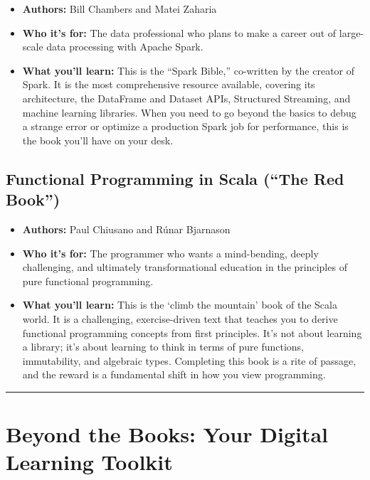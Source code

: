 \documentclass[
  letterpaper,
  DIV=11,
  numbers=noendperiod]{scrreprt}
\providecommand{\tightlist}{%
  \setlength{\itemsep}{0pt}\setlength{\parskip}{0pt}}
\begin{document}
\begin{itemize}
\tightlist
\item
  \textbf{Authors:} Bill Chambers and Matei Zaharia
\item
  \textbf{Who it's for:} The data professional who plans to make a
  career out of large-scale data processing with Apache Spark.
\item
  \textbf{What you'll learn:} This is the ``Spark Bible,'' co-written by
  the creator of Spark. It is the most comprehensive resource available,
  covering its architecture, the DataFrame and Dataset APIs, Structured
  Streaming, and machine learning libraries. When you need to go beyond
  the basics to debug a strange error or optimize a production Spark job
  for performance, this is the book you'll have on your desk.
\end{itemize}

\subsection{\texorpdfstring{\textbf{Functional Programming in Scala
(``The Red
Book'')}}{Functional Programming in Scala (``The Red Book'')}}\label{functional-programming-in-scala-the-red-book}

\begin{itemize}
\tightlist
\item
  \textbf{Authors:} Paul Chiusano and Rúnar Bjarnason
\item
  \textbf{Who it's for:} The programmer who wants a mind-bending, deeply
  challenging, and ultimately transformational education in the
  principles of pure functional programming.
\item
  \textbf{What you'll learn:} This is the `climb the mountain' book of
  the Scala world. It is a challenging, exercise-driven text that
  teaches you to derive functional programming concepts from first
  principles. It's not about learning a library; it's about learning to
  think in terms of pure functions, immutability, and algebraic types.
  Completing this book is a rite of passage, and the reward is a
  fundamental shift in how you view programming.
\end{itemize}

\begin{center}\rule{0.5\linewidth}{0.5pt}\end{center}

\section{\texorpdfstring{\textbf{Beyond the Books: Your Digital Learning
Toolkit}}{Beyond the Books: Your Digital Learning Toolkit}}\label{beyond-the-books-your-digital-learning-toolkit}
\end{document}
